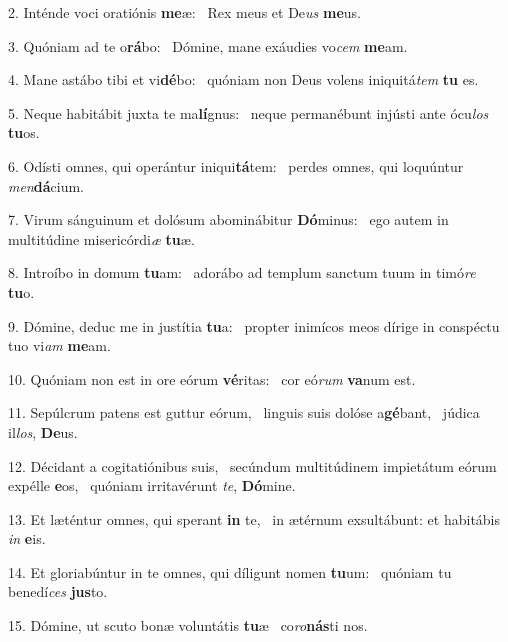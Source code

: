 2. Inténde voci oratiónis \textbf{me}æ: \ast\  Rex meus et De\textit{us} \textbf{me}us.\

3. Quóniam ad te o\textbf{rá}bo: \ast\  Dómine, mane exáudies vo\textit{cem} \textbf{me}am.\

4. Mane astábo tibi et vi\textbf{dé}bo: \ast\  quóniam non Deus volens iniquitá\textit{tem} \textbf{tu} es.\

5. Neque habitábit juxta te ma\textbf{lí}gnus: \ast\  neque permanébunt injústi ante ócu\textit{los} \textbf{tu}os.\

6. Odísti omnes, qui operántur iniqui\textbf{tá}tem: \ast\  perdes omnes, qui loquúntur \textit{men}\textbf{dá}cium.\

7. Virum sánguinum et dolósum abominábitur \textbf{Dó}minus: \ast\  ego autem in multitúdine misericórdi\textit{æ} \textbf{tu}æ.\

8. Introíbo in domum \textbf{tu}am: \ast\  adorábo ad templum sanctum tuum in timó\textit{re} \textbf{tu}o.\

9. Dómine, deduc me in justítia \textbf{tu}a: \ast\  propter inimícos meos dírige in conspéctu tuo vi\textit{am} \textbf{me}am.\

10. Quóniam non est in ore eórum \textbf{vé}ritas: \ast\  cor eó\textit{rum} \textbf{va}num est.\

11. Sepúlcrum patens est guttur eórum, \dag\  linguis suis dolóse a\textbf{gé}bant, \ast\  júdica il\textit{los}, \textbf{De}us.\

12. Décidant a cogitatiónibus suis, \dag\  secúndum multitúdinem impietátum eórum expélle \textbf{e}os, \ast\  quóniam irritavérunt \textit{te}, \textbf{Dó}mine.\

13. Et læténtur omnes, qui sperant \textbf{in} te, \ast\  in ætérnum exsultábunt: et habitábis \textit{in} \textbf{e}is.\

14. Et gloriabúntur in te omnes, qui díligunt nomen \textbf{tu}um: \ast\  quóniam tu benedí\textit{ces} \textbf{jus}to.\

15. Dómine, ut scuto bonæ voluntátis \textbf{tu}æ \ast\  co\textit{ro}\textbf{nás}ti nos.\

